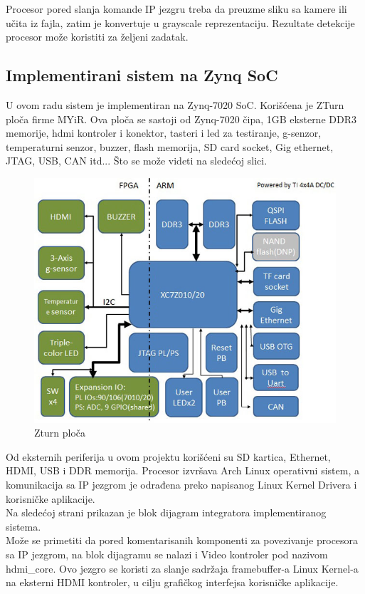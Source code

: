 Procesor pored slanja komande IP jezgru treba da preuzme sliku sa kamere ili
učita iz fajla, zatim je konvertuje u grayscale reprezentaciju.
Rezultate detekcije procesor može koristiti za željeni zadatak. \\

\newpage

\subsection{Implementirani sistem na Zynq SoC}

U ovom radu sistem je implementiran na Zynq-7020 SoC.
Korišćena je ZTurn\cite{zturn} ploča firme MYiR.
Ova ploča se sastoji od Zynq-7020 čipa, 1GB eksterne DDR3 memorije, \gls{hdmi}
kontroler i konektor, tasteri i \gls{led} za testiranje, g-senzor, temperaturni
senzor, buzzer, flash memorija, SD card socket, Gig ethernet, JTAG, USB, CAN itd...
Što se može videti na sledećoj slici. \\

\begin{figure}[H]
  \centering
  \includegraphics[width=0.65\linewidth]{images/zturn.jpg}
  \caption{Zturn ploča\cite{zturn}}
  \label{zturn_bd}
\end{figure}



Od eksternih periferija u ovom projektu korišćeni su SD kartica, Ethernet, HDMI,
USB i DDR memorija.
Procesor izvršava Arch Linux\cite{arch} operativni sistem, a komunikacija sa IP jezgrom je
odrađena preko napisanog Linux Kernel Drivera i korisničke aplikacije. \\

Na sledećoj strani prikazan je blok dijagram integratora implementiranog
sistema. \\
Može se primetiti da pored komentarisanih komponenti za povezivanje procesora sa
IP jezgrom, na blok dijagramu se nalazi i Video kontroler pod nazivom
hdmi\_core.
Ovo jezgro se koristi za slanje sadržaja framebuffer-a Linux Kernel-a na
eksterni HDMI kontroler, u cilju grafičkog interfejsa korisničke aplikacije. \\

